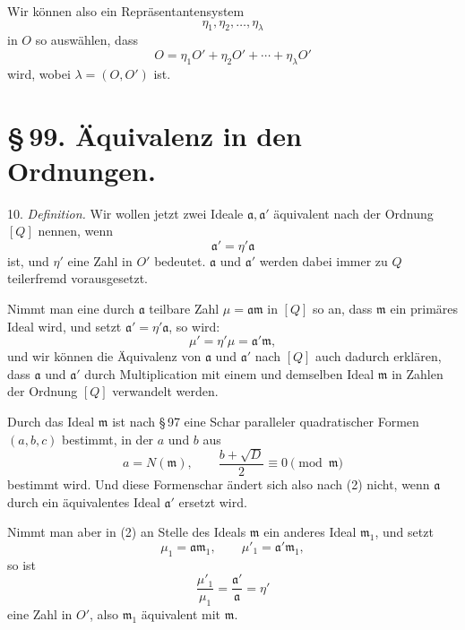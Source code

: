 \documentclass[11pt]{article}
\begin{document}
Wir können also ein Repräsentantensystem
\[
 \eta_1,\eta_2,\ldots,\eta_\lambda
\]
in $O$ so auswählen, dass
\begin{equation}
 O=\eta_1O'+\eta_2O'+\cdots+\eta_\lambda O'
\tag{11}
\end{equation}
wird, wobei $\lambda=(O,O')$ ist.

\section*{\S\,99. Äquivalenz in den Ordnungen.}

10. \emph{Definition.} Wir wollen jetzt zwei Ideale $\mathfrak a,\mathfrak a'$ äquivalent nach der Ordnung $[Q]$ nennen, wenn
\begin{equation}
 \mathfrak a'=\eta'\mathfrak a
\tag{1}
\end{equation}
ist, und $\eta'$ eine Zahl in $O'$ bedeutet. $\mathfrak a$ und $\mathfrak a'$ werden dabei immer zu $Q$ teilerfremd vorausgesetzt.

Nimmt man eine durch $\mathfrak a$ teilbare Zahl $\mu=\mathfrak a\mathfrak m$ in $[Q]$ so an, dass $\mathfrak m$ ein primäres Ideal wird, und setzt $\mathfrak a'=\eta'\mathfrak a$, so wird:
\begin{equation}
 \mu'=\eta'\mu=\mathfrak a'\mathfrak m,
\tag{2}
\end{equation}
und wir können die Äquivalenz von $\mathfrak a$ und $\mathfrak a'$ nach $[Q]$ auch dadurch erklären, dass $\mathfrak a$ und $\mathfrak a'$ durch Multiplication mit einem und demselben Ideal $\mathfrak m$ in Zahlen der Ordnung $[Q]$ verwandelt werden.

Durch das Ideal $\mathfrak m$ ist nach \S\,97 eine Schar paralleler quadratischer Formen $(a,b,c)$ bestimmt, in der $a$ und $b$ aus
\begin{equation}
 a=N(\mathfrak m),\qquad
 \frac{b+\sqrt D}{2}\equiv0\pmod{\mathfrak m}
\tag{3}
\end{equation}
bestimmt wird. Und diese Formenschar ändert sich also nach (2) nicht, wenn $\mathfrak a$ durch ein äquivalentes Ideal $\mathfrak a'$ ersetzt wird.

Nimmt man aber in (2) an Stelle des Ideals $\mathfrak m$ ein anderes Ideal $\mathfrak m_1$, und setzt
\begin{equation}
 \mu_1=\mathfrak a\mathfrak m_1,\qquad
 \mu'_1=\mathfrak a'\mathfrak m_1,
\tag{4}
\end{equation}
so ist
\[
 \frac{\mu'_1}{\mu_1}=\frac{\mathfrak a'}{\mathfrak a}=\eta'
\]
eine Zahl in $O'$, also $\mathfrak m_1$ äquivalent mit $\mathfrak m$.
\end{document}
